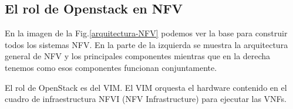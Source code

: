 \subsection{El rol de Openstack en NFV}
En la imagen de la Fig.\ref{arquitectura-NFV} podemos ver la base para construir todos los sistemas NFV. En la parte de la izquierda se muestra la arquitectura general de NFV y los principales componentes mientras que en la derecha tenemos como esos componentes funcionan conjuntamente.

El rol de OpenStack es del VIM. El VIM orquesta el hardware contenido en el cuadro de infraestructura NFVI (NFV Infrastructure) para ejecutar las VNFs.


